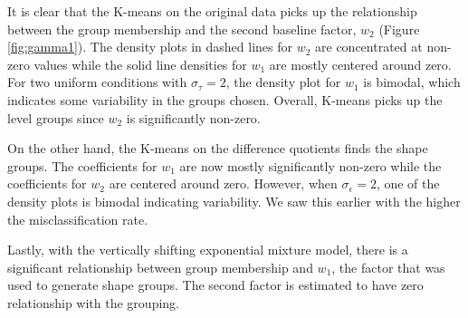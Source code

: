 It is clear that the K-means on the original data picks up the relationship between the group membership and the second baseline factor, $w_{2}$ (Figure \ref{fig:gamma1}). The density plots in dashed lines for $w_{2}$ are concentrated at non-zero values while the solid line densities for $w_{1}$ are mostly centered around zero. For two uniform conditions with $\sigma_{\tau}=2$, the density plot for $w_{1}$ is bimodal, which indicates some variability in the groups chosen. Overall, K-means picks up the level groups since $w_{2}$ is significantly non-zero.

On the other hand, the K-means on the difference quotients finds the shape groups. The coefficients for $w_{1}$ are now mostly significantly non-zero while the coefficients for $w_{2}$ are centered around zero. However, when $\sigma_{\epsilon}=2$, one of the density plots is bimodal indicating variability. We saw this earlier with the higher the misclassification rate.

Lastly, with the vertically shifting exponential mixture model, there is a significant relationship between group membership and $w_{1}$, the factor that was used to generate shape groups. The second factor is estimated to have zero relationship with the grouping.

